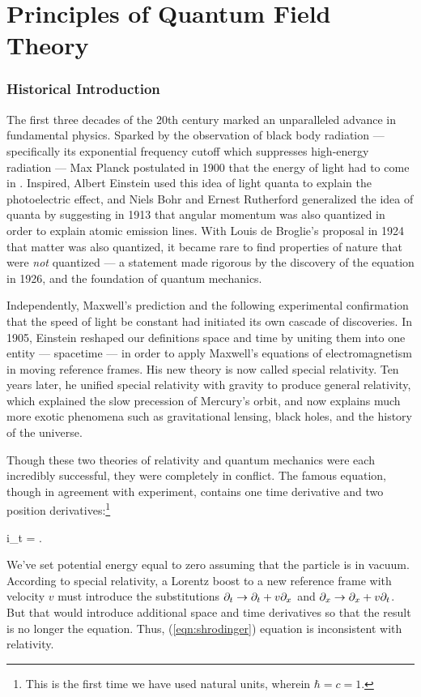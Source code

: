 \chapter{Principles of Quantum Field Theory}
\label{chap:intro}

\subsection{Historical Introduction}

The first three decades of the 20th century marked an unparalleled advance in fundamental physics. Sparked by the observation of black body radiation --- specifically its exponential frequency cutoff which suppresses high-energy radiation --- Max Planck postulated in 1900 that the energy of light had to come in . Inspired, Albert Einstein used this idea of light quanta to explain the photoelectric effect, and Niels Bohr and Ernest Rutherford generalized the idea of quanta by suggesting in 1913 that angular momentum was also quantized in order to explain atomic emission lines. With Louis de Broglie's proposal in 1924 that matter was also quantized, it became rare to find properties of nature that were \textit{not} quantized --- a statement made rigorous by the discovery of the \Schrodinger equation in 1926, and the foundation of quantum mechanics.

Independently, Maxwell's prediction and the following experimental confirmation that the speed of light be constant had initiated its own cascade of discoveries. In 1905, Einstein reshaped our definitions space and time by uniting them into one entity --- spacetime --- in order to apply Maxwell's equations of electromagnetism in moving reference frames. His new theory is now called special relativity. Ten years later, he unified special relativity with gravity to produce general relativity, which explained the slow precession of Mercury's orbit, and now explains much more exotic phenomena such as gravitational lensing, black holes, and the history of the universe.

Though these two theories of relativity and quantum mechanics were each incredibly successful, they were completely in conflict. The famous \Schrodinger equation, though in agreement with experiment, contains one time derivative and two position derivatives:\footnote{This is the first time we have used natural units, wherein $\hbar = c = 1$.}
\begin{e}
  i\partial_t \psi = \psi.
  \label{eqn:shrodinger}
\end{e}
We've set potential energy equal to zero assuming that the particle is in vacuum. According to special relativity, a Lorentz boost to a new reference frame with velocity $v$ must introduce the substitutions $\partial_t \rightarrow \partial_t + v \partial_x$ and $\partial_x \rightarrow \partial_x + v \partial_t$. But that would introduce additional space and time derivatives so that the result is no longer the \Schrodinger equation. Thus, (\ref{eqn:shrodinger}) equation is inconsistent with relativity.

